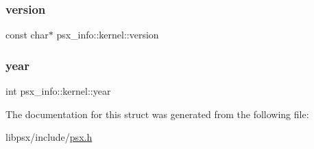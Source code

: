 \mbox{\label{structpsx__info_1_1kernel_adf920bd7e3545f508697900f6da60940}} 
\subsubsection{\texorpdfstring{version}{version}}
{\footnotesize\ttfamily const char$\ast$ psx\+\_\+info\+::kernel\+::version}

\mbox{\label{structpsx__info_1_1kernel_a347d5fa74908bbc54b31530a0a3e3416}} 
\subsubsection{\texorpdfstring{year}{year}}
{\footnotesize\ttfamily int psx\+\_\+info\+::kernel\+::year}



The documentation for this struct was generated from the following file\+:\begin{DoxyCompactItemize}
\item 
libpsx/include/\hyperlink{psx_8h}{psx.\+h}\end{DoxyCompactItemize}
